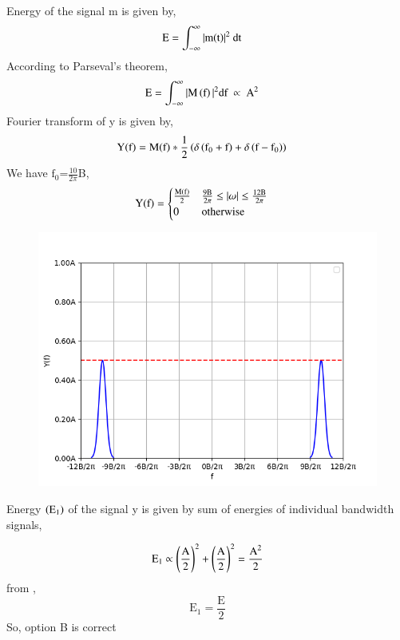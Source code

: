 \documentclass[beamer]{IEEEtran}
\theoremstyle{remark}
\begin{document}
Energy  of the signal m is given by,
\begin{align}
    \text{E}&=\int_{-\infty}^{\infty}|\text{m\brak{\text{t}}}|^2\ \text{dt}
\end{align}
According to Parseval's theorem,
\begin{align}
\label{2}
    \text{E}&=\int_{-\infty}^{\infty}|\text{M}\brak{\text{f}}|^2\text{df}\ \propto\ \text{A}^2
\end{align}
Fourier transform of y is given by,
\begin{align}
\text{Y\ensuremath{\left(\text{f}\right)}}&=\text{M\ensuremath{\left(\text{f}\right)}}*\frac{1}{2}\left(\delta\left(\text{f}_0+\text{f}\right)+\delta\left(\text{f}-\text{f}_0\right)\right)
\end{align}
We have $\text{f}_0$=$\frac{10}{2\pi}$B,
\begin{align}
\text{Y\ensuremath{\left(\text{f}\right)}}&=
\begin{cases}
    \frac{\text{M\ensuremath{\left(\text{f}\right)}}}{2}&\frac{9\text{B}}{2\pi}\leq\left\vert\omega\right\vert\leq\frac{12\text{B}}{2\pi}\\
    0 & \text{otherwise}
\end{cases}
\end{align}
\begin{figure}[h]
    \centering
    \includegraphics[scale=0.50]{figs/ec,27(1).png}
    \label{fig:enter-label}
\end{figure}

Energy $\left(\text{E}_1\right)$ of the signal y is given by sum of energies of individual bandwidth signals,

$$\text{E}_1\propto \left(\frac{\text{A}}{2}\right)^2+\left(\frac{\text{A}}{2}\right)^2=\frac{\text{A}^2}{2}$$
from \brak{\ref{2}},\\
$$\text{E}_1=\frac{\text{E}}{2}$$
So, option B is correct
\end{document}
